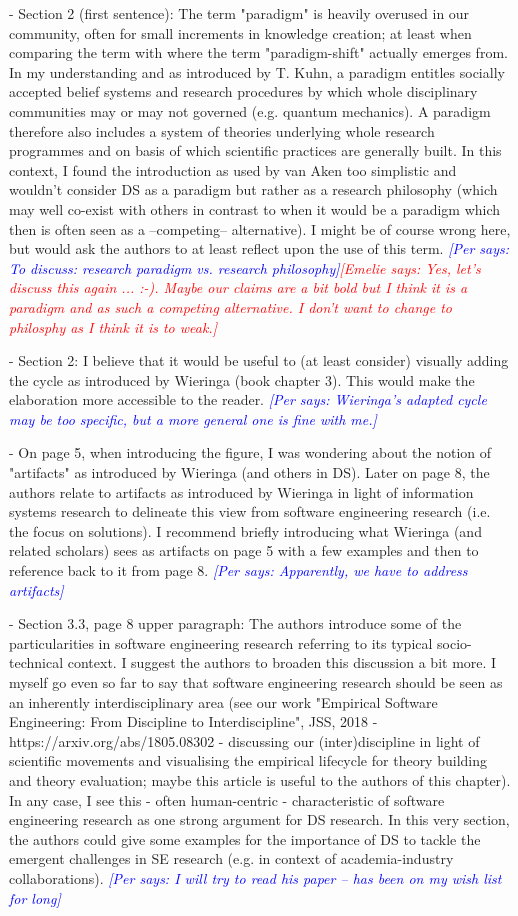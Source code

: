 \documentclass{article}
\newcommand{\emelie}[1]{\textcolor{red}{{\it [Emelie says: #1]}}}
\newcommand{\per}[1]{\textcolor{blue}
        	{{\it [Per says: #1]}}}
\newcommand{\emelie}[1]{}
\newcommand{\per}[1]{}
\begin{document}
- Section 2 (first sentence): The term "paradigm" is heavily overused in our community, often for small increments in knowledge creation; at least when comparing the term with  where the term "paradigm-shift" actually emerges from. In my understanding and as introduced by T. Kuhn, a paradigm entitles socially accepted belief systems and research procedures by which whole disciplinary communities may or may not governed (e.g. quantum mechanics). A paradigm therefore also includes a system of theories underlying whole research programmes and on basis of which scientific practices are generally built. In this context, I found the introduction as used by van Aken too simplistic and wouldn't consider DS as a paradigm but rather as a research philosophy (which may well co-exist with others in contrast to when it would be a paradigm which then is often seen as a --competing-- alternative). I might be of course wrong here, but would ask the authors to at least reflect upon the use of this term. \per{To discuss: research paradigm vs. research philosophy}\emelie{Yes, let's discuss this again ... :-). Maybe our claims are a bit bold but I think it is a paradigm and as such a competing alternative. I don't want to change to philosphy as I think it is to weak.}

- Section 2: I believe that it would be useful to (at least consider) visually adding the cycle as introduced by Wieringa (book chapter 3). This would make the elaboration more accessible to the reader. \per{Wieringa's adapted cycle may be too specific, but a more general one is fine with me.}

- On page 5, when introducing the figure, I was wondering about the notion of "artifacts" as introduced by Wieringa (and others in DS). Later on page 8, the authors relate to artifacts as introduced by Wieringa in light of information systems research to delineate this view from software engineering research (i.e. the focus on solutions). I recommend briefly introducing what Wieringa (and related scholars) sees as artifacts on page 5 with a few examples and then to reference back to it from page 8. \per{Apparently, we have to address artifacts}

- Section 3.3, page 8 upper paragraph: The authors introduce some of the particularities in software engineering research referring to its typical socio-technical context. I suggest the authors to broaden this discussion a bit more. I myself go even so far to say that software engineering research should be seen as an inherently interdisciplinary area (see our work "Empirical Software Engineering: From Discipline to Interdiscipline", JSS, 2018 - https://arxiv.org/abs/1805.08302 - discussing our (inter)discipline in light of scientific movements and visualising the empirical lifecycle for theory building and theory evaluation; maybe this article is useful to the authors of this chapter). In any case, I see this - often human-centric - characteristic of software engineering research as one strong argument for DS research. In this very section, the authors could give some examples for the importance of DS to tackle the emergent challenges in SE research (e.g. in context of academia-industry collaborations). \per{I will try to read his paper -- has been on my wish list for long}
\end{document}
